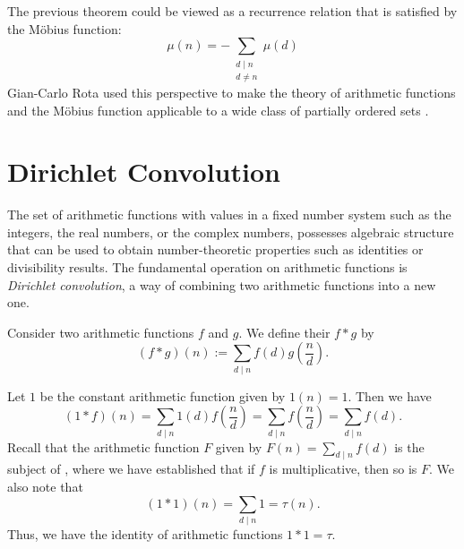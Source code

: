 \begin{remark}
  The previous theorem could be viewed as a recurrence relation that is satisfied by the M\"obius function:
  \begin{equation*}
    \mu(n)=-\sum_{\substack{d\mid n\\d\neq n}}\mu(d)
  \end{equation*}
  Gian-Carlo Rota used this perspective to make the theory of arithmetic functions and the M\"obius function applicable to a wide class of partially ordered sets \cite{rota1964}.
\end{remark}

\section{Dirichlet Convolution}

The set of arithmetic functions with values in a fixed number system such as the integers, the real numbers, or the complex numbers, possesses algebraic structure that can be used to obtain number-theoretic properties such as identities or divisibility results. The fundamental operation on arithmetic functions is \emph{Dirichlet convolution}, a way of combining two arithmetic functions into a new one.

\begin{definition}
  Consider two arithmetic functions $f$ and $g$. We define their  $f\ast g$ by
  \begin{equation*}
    (f\ast g)(n) := \sum_{d\mid n}f(d)g\left(\frac{n}{d}\right).
  \end{equation*}
\end{definition}

\begin{example}\label{example:1convolution1}
  Let $1$ be the constant arithmetic function given by $1(n)=1$. Then we have
  \begin{equation*}
    (1\ast f)(n)=\sum_{d\mid n}1(d)f\left(\frac{n}{d}\right)=\sum_{d\mid n}f\left(\frac{n}{d}\right)=\sum_{d\mid n}f(d).
  \end{equation*}
  Recall that the arithmetic function $F$ given by $F(n)=\sum_{d\mid n}f(d)$ is the subject of , where we have established that if $f$ is multiplicative, then so is $F$. We also note that
  \begin{equation*}
    (1\ast 1)(n)=\sum_{d\mid n}1 =\tau(n).
  \end{equation*}
  Thus, we have the identity of arithmetic functions $1\ast 1=\tau$.
\end{example}

